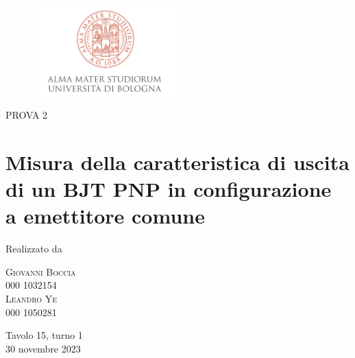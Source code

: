 \thispagestyle{empty} %

\begin{figure}[h]
    \centering
    \includegraphics[width=0.5\textwidth]{image/logo.png}
    \label{Logo}
\end{figure}

\vspace{0.5cm}

\begin{center}
{\large \textsc{PROVA 2}}
\end{center}

\section*{\centering \Huge \bf Misura della caratteristica di uscita \\di un BJT PNP in configurazione \\ a emettitore comune}

\vspace{3cm}

\begin{center}
{\large Realizzato da} \\
\vspace{2cm}

\begin{multicols}{2}
    \Large\textsc{Giovanni Boccia}\\ 000 1032154\\
    \Large\textsc{Leandro Ye}\\ 000 1050281\\
\end{multicols}
 
\end{center}

\vspace{3cm}

\begin{center}
{\large Tavolo 15, turno 1}\\
\vspace{1cm}
{\large 30 novembre 2023}
\end{center}

\newpage